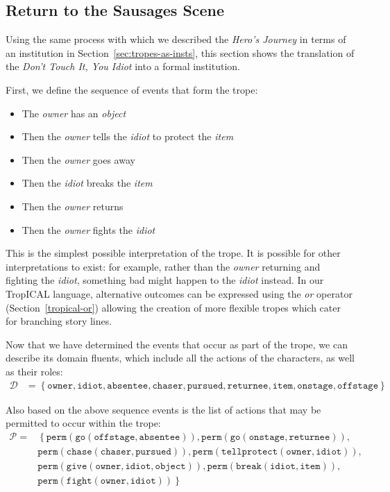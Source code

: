 \documentclass[11pt]{report}
\begin{document}
\subsection{Return to the Sausages Scene}

Using the same process with which we described the \emph{Hero's Journey} in
terms of an institution in Section~\ref{sec:tropes-as-insts}, this section shows
the translation of the \emph{Don't Touch It, You Idiot} into a formal institution.

First, we define the sequence of events that form the trope:

\begin{itemize}
\item The \emph{owner} has an \emph{object}
\item Then the \emph{owner} tells the \emph{idiot} to protect the \emph{item}
\item Then the \emph{owner} goes away
\item Then the \emph{idiot} breaks the \emph{item}
\item Then the \emph{owner} returns
\item Then the \emph{owner} fights the \emph{idiot}
\end{itemize}

This is the simplest possible interpretation of the trope. It is possible for
other interpretations to exist: for example, rather than the \emph{owner} returning and
fighting the \emph{idiot}, something bad might happen to the \emph{idiot}
instead. In our TropICAL language, alternative outcomes can be expressed using
the \emph{or} operator (Section~\ref{tropical-or}) allowing the creation of more flexible tropes
which cater for branching story lines.

Now that we have determined the events that occur as part of the trope, we can describe its domain fluents, which include all the
actions of the characters, as well as their roles:
\begin{align*}
   \mathcal{D} &= \left\{\mathtt{owner, idiot, absentee, chaser, pursued, returnee, item, onstage, offstage}\right\} %
\end{align*}

Also based on the above sequence events is the list of actions that may be
permitted to occur within the trope:
\begin{align*}
\mathcal{P} =& \left\{\mathtt{perm(go(offstage, absentee)), perm(go(onstage, returnee)),}\right.\nonumber\\
             &\left. {} \mathtt{ perm(chase(chaser, pursued)), perm(tellprotect(owner, idiot)),}\right.\nonumber\\
             &\left. {} \mathtt{perm(give(owner, idiot, object)), perm(break(idiot, item)),}\right.\nonumber\\
             &\left. {} \mathtt{perm(fight(owner, idiot))}\right\} %
\end{align*}
\end{document}
